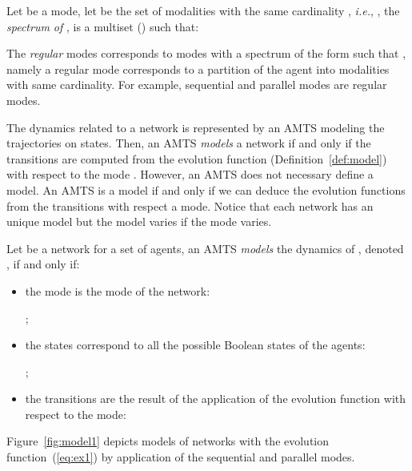 \documentclass[12pt]{elsarticle}
\newcommand{\abbrev}[1]{#1, \relax}
\newcommand{\ie}[0]{\abbrev{\textit{i.e.}}}
\begin{document}
\begin{definition}
\label{def:spectrum}
Let  be a mode, let  be the set of modalities with the same cardinality , \ie , the \emph{spectrum of} ,  is a multiset () such that: 


\end{definition}
The \emph{regular} modes corresponds to modes with a spectrum of the form  such that , namely a regular mode corresponds to a partition of the agent into modalities with same cardinality. For example, sequential and parallel modes are regular modes.

The dynamics related to a network  is represented by an AMTS modeling the trajectories on states. Then, an AMTS  \emph{models} a network if and only if the transitions are computed from the evolution function (Definition~\ref{def:model}) with respect to the mode . However, an AMTS does not necessary define a model. An AMTS is a model if and only if we can deduce the evolution functions from the transitions with respect a mode. Notice that each network has an unique model but the model varies if the mode varies.



\begin{definition}
\label{def:model}
Let  be a network for a set  of agents, an AMTS  \emph{models} the dynamics of , denoted , if and only if:
\begin{itemize}
\item the mode is the mode of the network: 

; 
\item the states correspond to all the possible Boolean states of the agents: 

;
\item the transitions are the result of the application of the evolution function with respect to the mode:



\end{itemize}
\end{definition}
Figure~\ref{fig:model1} depicts models of networks with the evolution function~(\ref{eq:ex1}) by application of the sequential and parallel modes. 
\end{document}
